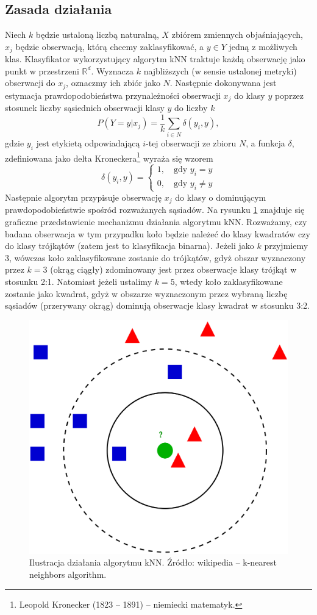 \documentclass[a4paper]{article}
\begin{document}
\subsection{Zasada działania}
Niech $k$ będzie ustaloną liczbą naturalną, $X$ zbiórem zmiennych objaśniających, $x_j$ będzie obserwacją, którą chcemy zaklasyfikować, a $y\in Y$ jedną z możliwych klas. Klasyfikator wykorzystujący algorytm kNN traktuje każdą obserwację jako punkt w przestrzeni $\mathbb{R}^d$. Wyznacza $k$ najbliższych (w sensie ustalonej metryki) obserwacji do $x_j$, oznaczmy ich zbiór jako $N$. Następnie dokonywana jest estymacja prawdopodobieństwa przynależności obserwacji $x_j$ do klasy $y$ poprzez stosunek liczby  sąsiednich obserwacji klasy $y$ do liczby $k$
\begin{equation}
    P(Y=y|x_j) =\frac{1}{k} \sum\limits_{i \in N}{\delta(y_i, y)},
\end{equation}
gdzie $y_i$ jest etykietą odpowiadającą $i$-tej obserwacji ze zbioru $N$, a funkcja $\delta$, zdefiniowana jako delta Kroneckera\footnote{Leopold Kronecker (1823 -- 1891) -- niemiecki matematyk.} wyraża się wzorem
\begin{equation}
    \delta(y_i,y) = \left\{ \begin{array}{ll}
    1,\quad\textrm{gdy $y_i = y$}\\
    0,\quad\textrm{gdy $y_i \neq y$}
\end{array} \right.
\end{equation}
Następnie algorytm przypisuje obserwację $x_j$ do klasy o dominującym prawdopodobieństwie spośród rozważanych sąsiadów. Na rysunku \ref{r(2.6)}  znajduje się graficzne przedstawienie mechanizmu działania algorytmu kNN. Rozważamy, czy badana obserwacja w tym przypadku  koło będzie należeć do klasy kwadratów czy do klasy trójkątów (zatem jest to klasyfikacja binarna). Jeżeli jako $k$ przyjmiemy 3, wówczas koło zaklasyfikowane zostanie do trójkątów, gdyż obszar wyznaczony przez $k=3$ (okrąg ciągły) zdominowany jest przez obserwacje klasy trójkąt w stosunku 2:1. Natomiast jeżeli ustalimy $k=5$, wtedy koło zaklasyfikowane zostanie jako kwadrat, gdyż w obszarze wyznaczonym przez wybraną liczbę sąsiadów (przerywany okrąg) dominują obserwacje klasy kwadrat w stosunku 3:2.
\begin{figure}[ht]
   \centering
    \includegraphics[width=200 pt, height = 180 pt]{knnWIKI.png}
    \caption{Ilustracja działania algorytmu kNN. Źródło: wikipedia -- k-nearest neighbors algorithm.}
    \label{r(2.6)}
\end{figure}
\newpage
\end{document}
